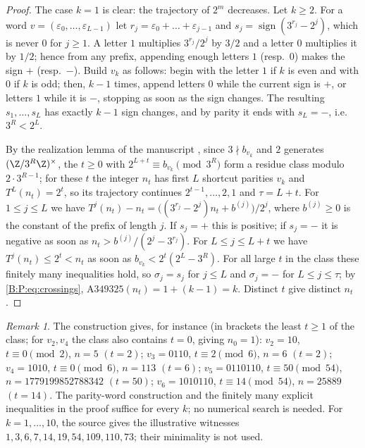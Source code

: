 \documentclass[11pt,a4paper]{article}
\theoremstyle{definition}
\theoremstyle{remark}
\newtheorem{remark}[theorem]{Remark}
\numberwithin{equation}{section}
\begin{document}
\begin{proof}
The case $k=1$ is clear: the trajectory of $2^m$ decreases. Let $k\ge2$. For a
word $v=(\varepsilon_0,\dots,\varepsilon_{L-1})$ let
$r_j=\varepsilon_0+\dots+\varepsilon_{j-1}$ and
$s_j=\operatorname{sign}(3^{r_j}-2^j)$, which is never $0$ for $j\ge1$. A letter
$1$ multiplies $3^{r_j}/2^j$ by $3/2$ and a letter $0$ multiplies it by $1/2$;
hence from any prefix, appending enough letters $1$ (resp.\ $0$) makes the sign
$+$ (resp.\ $-$). Build $v_k$ as follows: begin with the letter $1$ if $k$ is
even and with $0$ if $k$ is odd; then, $k-1$ times, append letters $0$ while the
current sign is $+$, or letters $1$ while it is $-$, stopping as soon as the sign
changes. The resulting $s_1,\dots,s_L$ has exactly $k-1$ sign changes, and by
parity it ends with $s_L=-$, i.e.\ $3^R<2^L$.

By the realization lemma of the manuscript \cite[Section~3.1]{R021}, since
$3\nmid b_{v_k}$ and $2$ generates $(\Z/3^R\Z)^\times$, the $t\ge0$ with
$2^{L+t}\equiv b_{v_k}\pmod{3^R}$ form a residue class modulo $2\cdot3^{R-1}$;
for these $t$ the integer $n_t$ has first $L$ shortcut parities $v_k$ and
$T^L(n_t)=2^t$, so its trajectory continues $2^{t-1},\dots,2,1$ and
$\tau=L+t$. For $1\le j\le L$ we have
$T^j(n_t)-n_t=\bigl((3^{r_j}-2^j)n_t+b^{(j)}\bigr)/2^j$, where $b^{(j)}\ge0$ is
the constant of the prefix of length $j$. If $s_j=+$ this is positive; if
$s_j=-$ it is negative as soon as $n_t>b^{(j)}/(2^j-3^{r_j})$. For
$L\le j\le L+t$ we have $T^j(n_t)\le2^t<n_t$ as soon as
$b_{v_k}<2^t(2^L-3^R)$. For all large $t$ in the class these finitely many
inequalities hold, so $\sigma_j=s_j$ for $j\le L$ and $\sigma_j=-$ for
$L\le j\le\tau$; by \eqref{B:P:eq:crossings}, $\mathrm{A349325}(n_t)=1+(k-1)=k$.
Distinct $t$ give distinct $n_t$.
\end{proof}

\begin{remark}
The construction gives, for instance (in brackets the least $t\ge1$ of the class; for $v_2,v_4$ the class also contains $t=0$, giving $n_0=1$):
$v_2=10$, $t\equiv0\pmod2$, $n=5$ $(t=2)$;
$v_3=0110$, $t\equiv2\pmod6$, $n=6$ $(t=2)$;
$v_4=1010$, $t\equiv0\pmod6$, $n=113$ $(t=6)$;
$v_5=0110110$, $t\equiv50\pmod{54}$, $n=1779199852788342$ $(t=50)$;
$v_6=1010110$, $t\equiv14\pmod{54}$, $n=25889$ $(t=14)$.
The parity-word construction and the finitely many explicit inequalities
in the proof suffice for every $k$; no numerical search is needed. For $k=1,\dots,10$, the source gives the illustrative witnesses
$1,3,6,7,14,19,54,109,110,73$; their minimality is not used.
\end{remark}
\end{document}
